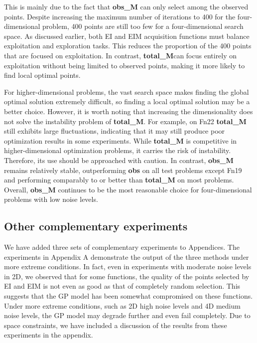 \documentclass{article}
\begin{document}
\hspace{2em}This is mainly due to the fact that \textbf{obs\_M} can only select among the observed points. Despite increasing the maximum number of iterations to 400 for the four-dimensional problem, 400 points are still too few for a four-dimensional search space.  As discussed earlier, both EI and EIM acquisition functions must balance exploitation and exploration tasks. This reduces the proportion of the 400 points that are focused on exploitation. In contrast, \textbf{total\_M}can focus entirely on exploitation without being limited to observed points, making it more likely to find local optimal points. 

\hspace{2em}For higher-dimensional problems, the vast search space makes finding the global optimal solution extremely difficult, so finding a local optimal solution may be a better choice. However, it is worth noting that increasing the dimensionality does not solve the instability problem of \textbf{total\_M}. For example, on Fn22 \textbf{total\_M} still exhibits large fluctuations, indicating that it may still produce poor optimization results in some experiments. While \textbf{total\_M} is competitive in higher-dimensional optimization problems, it carries the risk of instability. Therefore, its use should be approached with caution. In contrast, \textbf{obs\_M} remains relatively stable, outperforming \textbf{obs} on all test problems except Fn19 and performing comparably to or better than \textbf{total\_M} on most problems. Overall, \textbf{obs\_M} continues to be the most reasonable choice for four-dimensional problems with low noise levels. 

\subsection{Other complementary experiments}
\hspace{2em}We have added three sets of complementary experiments to Appendices. The experiments in Appendix A demonstrate the output of the three methods under more extreme conditions. In fact, even in experiments with moderate noise levels in 2D, we observed that for some functions, the quality of the points selected by EI and EIM is not even as good as that of completely random selection. This suggests that the GP model has been somewhat compromised on these functions. Under more extreme conditions, such as 2D high noise levels and 4D medium noise levels, the GP model may degrade further and even fail completely. Due to space constraints, we have included a discussion of the results from these experiments in the appendix.
\end{document}
